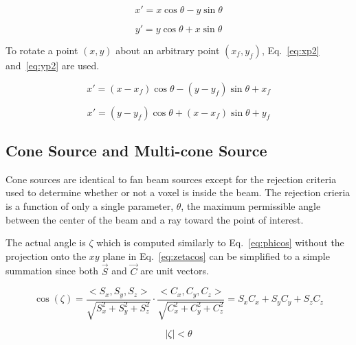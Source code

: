 \begin{equation}\label{eq:xp}
x' = x \cos \theta - y \sin \theta
\end{equation}

\begin{equation}\label{eq:yp}
y' = y \cos \theta + x \sin \theta
\end{equation}

To rotate a point $(x,y)$ about an arbitrary point $(x_f, y_f)$, Eq.~\ref{eq:xp2} and~\ref{eq:yp2} are used.

\begin{equation}\label{eq:xp2}
x' = (x-x_f) \cos \theta - (y-y_f) \sin \theta + x_f
\end{equation}

\begin{equation}\label{eq:yp2}
x' = (y - y_f) \cos \theta + (x - x_f) \sin \theta + y_f
\end{equation}

\subsection{Cone Source and Multi-cone Source}
Cone sources are identical to fan beam sources except for the rejection criteria used to determine whether or not a voxel is inside the beam. The rejection crieria is a function of only a single parameter, $\theta$, the maximum permissible angle between the center of the beam and a ray toward the point of interest.

The actual angle is $\zeta$ which is computed similarly to Eq.~\ref{eq:phicos} without the projection onto the $xy$ plane in Eq.~\ref{eq:zetacos} can be simplified to a simple summation since both $\vec{S}$ and $\vec{C}$ are unit vectors.

\begin{equation}\label{eq:zetacos}
\cos(\zeta) = \frac{<S_x, S_y, S_z>}{\sqrt{S_x^2 + S_y^2 + S_z^2}} \cdot \frac{<C_x, C_y, C_z>}{\sqrt{C_x^2 + C_y^2 + C_z^2}} = S_x C_x + S_y C_y + S_z C_z
\end{equation}

\begin{equation}\label{eq:zetacon}
|\zeta| < \theta
\end{equation}

